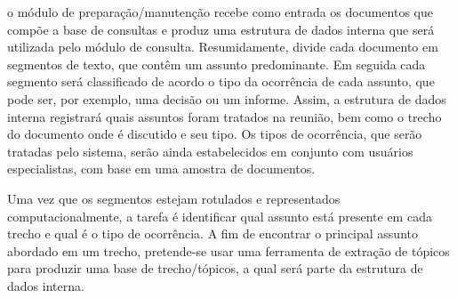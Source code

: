 





 




















o módulo de preparação/manutenção recebe como entrada os documentos que compõe a base de consultas e produz uma estrutura de dados interna que será utilizada pelo módulo de consulta. Resumidamente, divide cada documento em segmentos de texto, que contêm um assunto predominante. Em seguida cada segmento será classificado de acordo o tipo da ocorrência de cada assunto, que pode ser, por exemplo, uma decisão ou um informe. Assim, a estrutura de dados interna registrará quais assuntos foram tratados na reunião, bem como o trecho do documento onde é discutido e seu tipo. Os tipos de ocorrência, que serão tratadas pelo sistema, serão ainda estabelecidos em conjunto com usuários especialistas, com base em uma amostra de documentos.

Uma vez que os segmentos estejam rotulados e representados computacionalmente, a tarefa é identificar qual assunto está presente em cada trecho e qual é o tipo de ocorrência. A fim de encontrar o principal assunto abordado em um trecho, pretende-se usar uma ferramenta de extração de tópicos para produzir uma base de trecho/tópicos, a qual será parte da estrutura de dados interna.

